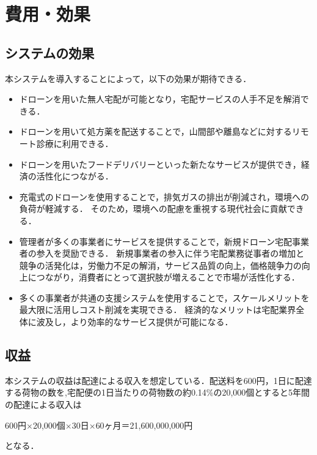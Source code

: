 \documentclass[a4paper, titlepage]{jsarticle}
\begin{document}
\section{費用・効果}
\subsection{システムの効果}
本システムを導入することによって，以下の効果が期待できる．
\begin{itemize}
\item ドローンを用いた無人宅配が可能となり，宅配サービスの人手不足を解消できる．
\item ドローンを用いて処方薬を配送することで，山間部や離島などに対するリモート診療に利用できる．
\item ドローンを用いたフードデリバリーといった新たなサービスが提供でき，経済の活性化につながる．
\item 充電式のドローンを使用することで，排気ガスの排出が削減され，環境への負荷が軽減する．
  そのため，環境への配慮を重視する現代社会に貢献できる．
  \item 管理者が多くの事業者にサービスを提供することで，新規ドローン宅配事業者の参入を奨励できる．
        新規事業者の参入に伴う宅配業務従事者の増加と競争の活発化は，労働力不足の解消，サービス品質の向上，価格競争力の向上につながり，消費者にとって選択肢が増えることで市場が活性化する．

  \item 多くの事業者が共通の支援システムを使用することで，スケールメリットを最大限に活用しコスト削減を実現できる．
        経済的なメリットは宅配業界全体に波及し，より効率的なサービス提供が可能になる．
\end{itemize}

\subsection{収益}
本システムの収益は配達による収入を想定している．配送料を600円，1日に配達する荷物の数を,宅配便の1日当たりの荷物数の約0.14\%の20,000個とすると5年間の配達による収入は

\begin{center}
  600円$\times$20,000個$\times$30日$\times$60ヶ月＝21,600,000,000円
\end{center}
となる．
\end{document}
